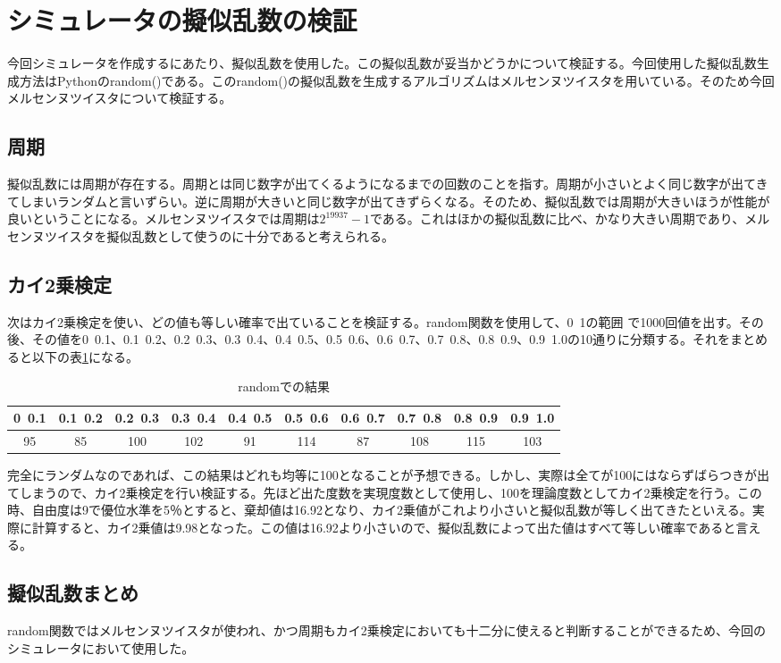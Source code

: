 \section{シミュレータの擬似乱数の検証}
今回シミュレータを作成するにあたり、擬似乱数を使用した。この擬似乱数が妥当かどうかについて検証する。今回使用した擬似乱数生成方法はPythonのrandom()である。このrandom()の擬似乱数を生成するアルゴリズムはメルセンヌツイスタを用いている。そのため今回メルセンヌツイスタについて検証する。
\subsection{周期}
擬似乱数には周期が存在する。周期とは同じ数字が出てくるようになるまでの回数のことを指す。周期が小さいとよく同じ数字が出てきてしまいランダムと言いずらい。逆に周期が大きいと同じ数字が出てきずらくなる。そのため、擬似乱数では周期が大きいほうが性能が良いということになる。メルセンヌツイスタでは周期は$2^{19937}-1$である。これはほかの擬似乱数に比べ、かなり大きい周期であり、メルセンヌツイスタを擬似乱数として使うのに十分であると考えられる。
\subsection{カイ2乗検定}
次はカイ2乗検定を使い、どの値も等しい確率で出ていることを検証する。random関数を使用して、0~1の範囲
で1000回値を出す。その後、その値を0~0.1、0.1~0.2、0.2~0.3、0.3~0.4、0.4~0.5、0.5~0.6、0.6~0.7、0.7~0.8、0.8~0.9、0.9~1.0の10通りに分類する。それをまとめると以下の表\ref{x2}になる。
\begin{table}[H]
 \begin{center}
\caption{randomでの結果}
  \begin{tabular}{|c|c|c|c|c|c|c|c|c|c|} \hline 
  0~0.1 &  0.1~0.2 & 0.2~0.3 & 0.3~0.4 &  0.4~0.5 & 0.5~0.6 & 0.6~0.7 & 0.7~0.8 & 0.8~0.9 & 0.9~1.0 \\ \hline 
  95 & 85 & 100 & 102 & 91 & 114 & 87 & 108 & 115 & 103 \\ \hline
  \end{tabular}
   \label{x2}
 \end{center}
\end{table}
完全にランダムなのであれば、この結果はどれも均等に100となることが予想できる。しかし、実際は全てが100にはならずばらつきが出てしまうので、カイ2乗検定を行い検証する。先ほど出た度数を実現度数として使用し、100を理論度数としてカイ2乗検定を行う。この時、自由度は9で優位水準を5％とすると、棄却値は16.92となり、カイ2乗値がこれより小さいと擬似乱数が等しく出てきたといえる。実際に計算すると、カイ2乗値は9.98となった。この値は16.92より小さいので、擬似乱数によって出た値はすべて等しい確率であると言える。
\subsection{擬似乱数まとめ}
random関数ではメルセンヌツイスタが使われ、かつ周期もカイ2乗検定においても十二分に使えると判断することができるため、今回のシミュレータにおいて使用した。

